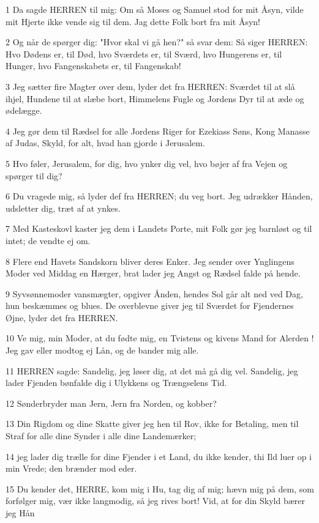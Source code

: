 \par 1 Da sagde HERREN til mig: Om så Moses og Samuel stod for mit Åsyn, vilde mit Hjerte ikke vende sig til dem. Jag dette Folk bort fra mit Åsyn!
\par 2 Og når de spørger dig: "Hvor skal vi gå hen?" så svar dem: Så siger HERREN: Hvo Dødens er, til Død, hvo Sværdets er, til Sværd, hvo Hungerens er, til Hunger, hvo Fangenskabets er, til Fangenskab!
\par 3 Jeg sætter fire Magter over dem, lyder det fra HERREN: Sværdet til at slå ihjel, Hundene til at slæbe bort, Himmelens Fugle og Jordens Dyr til at æde og ødelægge.
\par 4 Jeg gør dem til Rædsel for alle Jordens Riger for Ezekiass Søns, Kong Manasse af Judas, Skyld, for alt, hvad han gjorde i Jerusalem.
\par 5 Hvo føler, Jerusalem, for dig, hvo ynker dig vel, hvo bøjer af fra Vejen og spørger til dig?
\par 6 Du vragede mig, så lyder def fra HERREN; du veg bort. Jeg udrækker Hånden, udsletter dig, træt af at ynkes.
\par 7 Med Kasteskovl kaster jeg dem i Landets Porte, mit Folk gør jeg barnløst og til intet; de vendte ej om.
\par 8 Flere end Havets Sandskorn bliver deres Enker. Jeg sender over Ynglingens Moder ved Middag en Hærger, brat lader jeg Angst og Rædsel falde på hende.
\par 9 Syvsønnemoder vansmægter, opgiver Ånden, hendes Sol går alt ned ved Dag, hun beskæmmes og blues. De overblevne giver jeg til Sværdet for Fjendernes Øjne, lyder det fra HERREN.
\par 10 Ve mig, min Moder, at du fødte mig, en Tvistens og kivens Mand for Alerden ! Jeg gav eller modtog ej Lån, og de bander mig alle.
\par 11 HERREN sagde: Sandelig, jeg løser dig, at det må gå dig vel. Sandelig, jeg lader Fjenden bønfalde dig i Ulykkens og Trængselens Tid.
\par 12 Sønderbryder man Jern, Jern fra Norden, og kobber?
\par 13 Din Rigdom og dine Skatte giver jeg hen til Rov, ikke for Betaling, men til Straf for alle dine Synder i alle dine Landemærker;
\par 14 jeg lader dig trælle for dine Fjender i et Land, du ikke kender, thi Ild luer op i min Vrede; den brænder mod eder.
\par 15 Du kender det, HERRE, kom mig i Hu, tag dig af mig; hævn mig på dem, som forfølger mig, vær ikke langmodig, så jeg rives bort! Vid, at for din Skyld bærer jeg Hån
